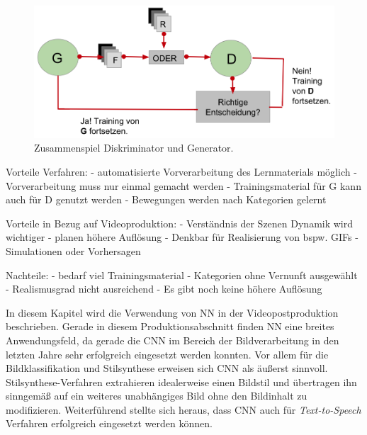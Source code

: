 \documentclass[times, 11pt,twocolumn]{article}
\begin{document}
\begin{figure}
	\flushleft
	\includegraphics[width=\columnwidth]{Bilder/disAndGen.jpg}
	\caption{Zusammenspiel Diskriminator und Generator.}
	\label{fig:disAndGen}
\end{figure}




 \label{sec:VondrickConclusion}

Vorteile Verfahren:
- automatisierte Vorverarbeitung des Lernmaterials möglich
- Vorverarbeitung muss nur einmal gemacht werden
- Trainingsmaterial für G kann auch für D genutzt werden
- Bewegungen werden nach Kategorien gelernt

Vorteile in Bezug auf Videoproduktion:
- Verständnis der Szenen Dynamik wird wichtiger
- planen höhere Auflösung
- Denkbar für Realisierung von bspw. GIFs
- Simulationen oder Vorhersagen 

Nachteile:
- bedarf viel Trainingsmaterial
- Kategorien ohne Vernunft ausgewählt
- Realismusgrad nicht ausreichend
- Es gibt noch keine höhere Auflösung




 \label{sec:Postroduktion}

In diesem Kapitel wird die Verwendung von NN in der Videopostproduktion beschrieben. Gerade in diesem Produktionsabschnitt finden NN eine breites Anwendungsfeld, da gerade die CNN im Bereich der Bildverarbeitung in den letzten Jahre sehr erfolgreich eingesetzt werden konnten. Vor allem für die Bildklassifikation und Stilsynthese erweisen sich CNN als äußerst sinnvoll. Stilsynthese-Verfahren extrahieren idealerweise einen Bildstil und übertragen ihn sinngemäß auf ein weiteres unabhängiges Bild ohne den Bildinhalt zu modifizieren. Weiterführend stellte sich  heraus, dass CNN auch für \textit{Text-to-Speech} Verfahren erfolgreich eingesetzt werden können.\\
\end{document}
